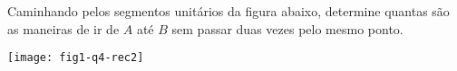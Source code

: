 \item  Caminhando pelos segmentos unitários da figura abaixo, determine quantas são as maneiras de
  ir de $A$ até $B$   sem passar duas vezes pelo mesmo ponto.\label{q4-rec}
  \begin{minipage}[h]{0.04\linewidth}
	\centering
	\texttt{[image: fig1-q4-rec2]}
  \end{minipage}

